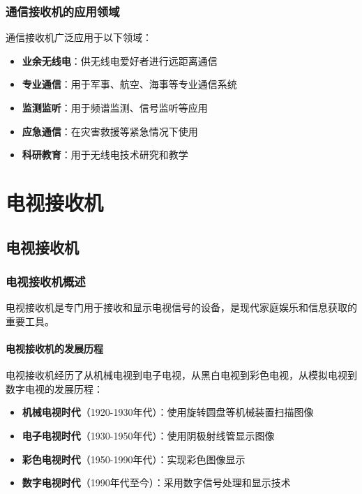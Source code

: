 \documentclass[12pt,UTF8]{ctexbook}
\begin{document}
\section{通信接收机的应用领域}

通信接收机广泛应用于以下领域：

\begin{itemize}[leftmargin=3.5em]
    \item \textbf{业余无线电}：供无线电爱好者进行远距离通信
    \item \textbf{专业通信}：用于军事、航空、海事等专业通信系统
    \item \textbf{监测监听}：用于频谱监测、信号监听等应用
    \item \textbf{应急通信}：在灾害救援等紧急情况下使用
    \item \textbf{科研教育}：用于无线电技术研究和教学
\end{itemize}

\part{电视接收机}

\chapter{电视接收机}

\section{电视接收机概述}

电视接收机是专门用于接收和显示电视信号的设备，是现代家庭娱乐和信息获取的重要工具。

\subsection{电视接收机的发展历程}

电视接收机经历了从机械电视到电子电视，从黑白电视到彩色电视，从模拟电视到数字电视的发展历程：

\begin{itemize}[leftmargin=3.5em]
    \item \textbf{机械电视时代}（1920-1930年代）：使用旋转圆盘等机械装置扫描图像
    \item \textbf{电子电视时代}（1930-1950年代）：使用阴极射线管显示图像
    \item \textbf{彩色电视时代}（1950-1990年代）：实现彩色图像显示
    \item \textbf{数字电视时代}（1990年代至今）：采用数字信号处理和显示技术
\end{itemize}
\end{document}
